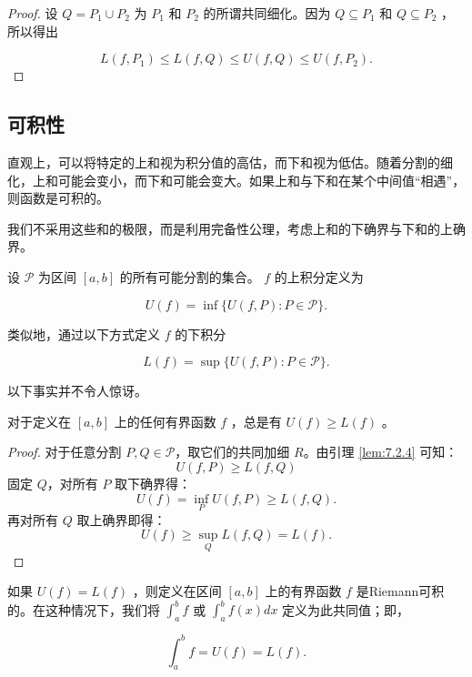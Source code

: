 \begin{proof}
  设 \(Q = {P}_{1} \cup  {P}_{2}\) 为 \({P}_{1}\) 和 \({P}_{2}\) 的所谓共同细化。因为 \(Q \subseteq  {P}_{1}\) 和 \(Q \subseteq  {P}_{2}\) ，所以得出

\[
L\left( {f,{P}_{1}}\right)  \leq  L\left( {f,Q}\right)  \leq  U\left( {f,Q}\right)  \leq  U\left( {f,{P}_{2}}\right) .
\]
\end{proof}


\subsection{可积性}

直观上，可以将特定的上和视为积分值的高估，而下和视为低估。随着分割的细化，上和可能会变小，而下和可能会变大。如果上和与下和在某个中间值“相遇”，则函数是可积的。

我们不采用这些和的极限，而是利用完备性公理，考虑上和的下确界与下和的上确界。

\begin{Def}
  \label{def:7.2.5}
  设 \(\mathcal{P}\) 为区间 \(\left\lbrack  {a,b}\right\rbrack\) 的所有可能分割的集合。 \(f\) 的上积分定义为

\[
U\left( f\right)  = \inf \{ U\left( {f,P}\right)  : P \in  \mathcal{P}\} .
\]

类似地，通过以下方式定义 \(f\) 的下积分

\[
L\left( f\right)  = \sup \{ U\left( {f,P}\right)  : P \in  \mathcal{P}\} .
\]

\end{Def}


以下事实并不令人惊讶。

\begin{Lem}\label{lem:7.2.6}
  对于定义在 \(\left\lbrack  {a,b}\right\rbrack\) 上的任何有界函数 \(f\) ，总是有 \(U\left( f\right)  \geq  L\left( f\right)\) 。
\end{Lem}


\begin{proof}
对于任意分割 \(P, Q \in \mathcal{P}\)，取它们的共同加细 \(R\)。由引理 \ref{lem:7.2.4} 可知：
\[
U(f,P) \geq L(f,Q)
\]
固定 \(Q\)，对所有 \(P\) 取下确界得：
\[
U(f) = \inf_P U(f,P) \geq L(f,Q).
\]
再对所有 \(Q\) 取上确界即得：
\[
U(f) \geq \sup_Q L(f,Q) = L(f).
\]
\end{proof}



\begin{Def}[Riemann可积性]
  \label{def:7.2.7}
  如果 \(U\left( f\right)  = L\left( f\right)\) ，则定义在区间 \(\left\lbrack  {a,b}\right\rbrack\) 上的有界函数 \(f\) 是Riemann可积的。在这种情况下，我们将 \({\int }_{a}^{b}f\) 或 \({\int }_{a}^{b}f\left( x\right) {dx}\) 定义为此共同值；即，

\[
{\int }_{a}^{b}f = U\left( f\right)  = L\left( f\right) .
\]
\end{Def}

